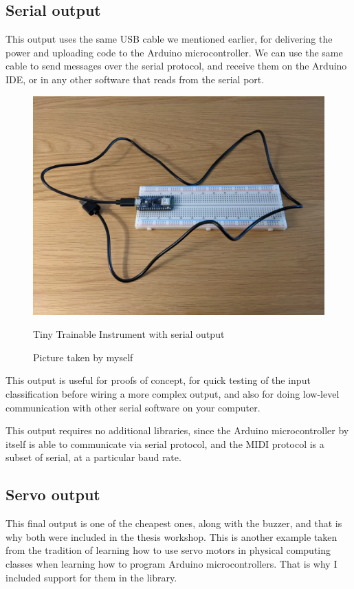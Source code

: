 \subsection{Serial output}

This output uses the same USB cable we mentioned earlier, for delivering the power and uploading code to the Arduino microcontroller. We can use the same cable to send messages over the serial protocol, and receive them on the Arduino IDE, or in any other software that reads from the serial port.
\begin{figure}[ht]

  \centering
  \includegraphics[width=0.75\linewidth,height=0.25\textheight,keepaspectratio]{images/output-serial.jpg}
  \caption{Tiny Trainable Instrument with serial output}
  \caption*{Picture taken by myself}
  \label{fig:output-serial}
\end{figure}

This output is useful for proofs of concept, for quick testing of the input classification before wiring a more complex output, and also for doing low-level communication with other serial software on your computer. 

This output requires no additional libraries, since the Arduino microcontroller by itself is able to communicate via serial protocol, and the MIDI protocol is a subset of serial, at a particular \gls{baud} rate.

\subsection{Servo output}

This final output is one of the cheapest ones, along with the buzzer, and that is why both were included in the thesis workshop. This is another example taken from the tradition of learning how to use servo motors in physical computing classes when learning how to program Arduino microcontrollers. That is why I included support for them in the library.

